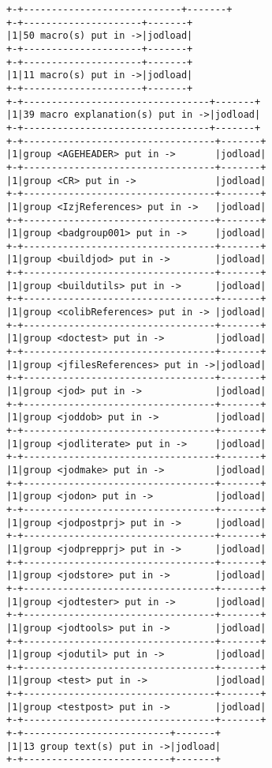 \documentclass[11pt,letter,landscape]{article}
\begin{document}
\begin{Verbatim}[commandchars=\\\{\}]
+-+----------------------------+-------+
+-+---------------------+-------+
|1|50 macro(s) put in ->|jodload|
+-+---------------------+-------+
+-+---------------------+-------+
|1|11 macro(s) put in ->|jodload|
+-+---------------------+-------+
+-+---------------------------------+-------+
|1|39 macro explanation(s) put in ->|jodload|
+-+---------------------------------+-------+
+-+----------------------------------+-------+
|1|group <AGEHEADER> put in ->       |jodload|
+-+----------------------------------+-------+
|1|group <CR> put in ->              |jodload|
+-+----------------------------------+-------+
|1|group <IzjReferences> put in ->   |jodload|
+-+----------------------------------+-------+
|1|group <badgroup001> put in ->     |jodload|
+-+----------------------------------+-------+
|1|group <buildjod> put in ->        |jodload|
+-+----------------------------------+-------+
|1|group <buildutils> put in ->      |jodload|
+-+----------------------------------+-------+
|1|group <colibReferences> put in -> |jodload|
+-+----------------------------------+-------+
|1|group <doctest> put in ->         |jodload|
+-+----------------------------------+-------+
|1|group <jfilesReferences> put in ->|jodload|
+-+----------------------------------+-------+
|1|group <jod> put in ->             |jodload|
+-+----------------------------------+-------+
|1|group <joddob> put in ->          |jodload|
+-+----------------------------------+-------+
|1|group <jodliterate> put in ->     |jodload|
+-+----------------------------------+-------+
|1|group <jodmake> put in ->         |jodload|
+-+----------------------------------+-------+
|1|group <jodon> put in ->           |jodload|
+-+----------------------------------+-------+
|1|group <jodpostprj> put in ->      |jodload|
+-+----------------------------------+-------+
|1|group <jodprepprj> put in ->      |jodload|
+-+----------------------------------+-------+
|1|group <jodstore> put in ->        |jodload|
+-+----------------------------------+-------+
|1|group <jodtester> put in ->       |jodload|
+-+----------------------------------+-------+
|1|group <jodtools> put in ->        |jodload|
+-+----------------------------------+-------+
|1|group <jodutil> put in ->         |jodload|
+-+----------------------------------+-------+
|1|group <test> put in ->            |jodload|
+-+----------------------------------+-------+
|1|group <testpost> put in ->        |jodload|
+-+----------------------------------+-------+
+-+--------------------------+-------+
|1|13 group text(s) put in ->|jodload|
+-+--------------------------+-------+

\end{Verbatim}
\end{document}
